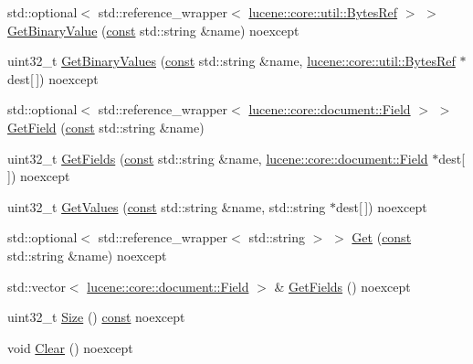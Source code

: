 \begin{DoxyCompactItemize}
\item 
std\+::optional$<$ std\+::reference\+\_\+wrapper$<$ \mbox{\hyperlink{classlucene_1_1core_1_1util_1_1BytesRef}{lucene\+::core\+::util\+::\+Bytes\+Ref}} $>$ $>$ \mbox{\hyperlink{classlucene_1_1core_1_1document_1_1Document_a3ec2c17e86ca5895821fb03f155c9d50}{Get\+Binary\+Value}} (\mbox{\hyperlink{ZlibCrc32_8h_a2c212835823e3c54a8ab6d95c652660e}{const}} std\+::string \&name) noexcept
\item 
uint32\+\_\+t \mbox{\hyperlink{classlucene_1_1core_1_1document_1_1Document_aa701ba52228c5faefba171031137a903}{Get\+Binary\+Values}} (\mbox{\hyperlink{ZlibCrc32_8h_a2c212835823e3c54a8ab6d95c652660e}{const}} std\+::string \&name, \mbox{\hyperlink{classlucene_1_1core_1_1util_1_1BytesRef}{lucene\+::core\+::util\+::\+Bytes\+Ref}} $\ast$dest\mbox{[}$\,$\mbox{]}) noexcept
\item 
std\+::optional$<$ std\+::reference\+\_\+wrapper$<$ \mbox{\hyperlink{classlucene_1_1core_1_1document_1_1Field}{lucene\+::core\+::document\+::\+Field}} $>$ $>$ \mbox{\hyperlink{classlucene_1_1core_1_1document_1_1Document_a30942eeb99fd914220503b9f68d9bd6a}{Get\+Field}} (\mbox{\hyperlink{ZlibCrc32_8h_a2c212835823e3c54a8ab6d95c652660e}{const}} std\+::string \&name)
\item 
uint32\+\_\+t \mbox{\hyperlink{classlucene_1_1core_1_1document_1_1Document_a8fcbb281ebfb1a4a075e189d099d3617}{Get\+Fields}} (\mbox{\hyperlink{ZlibCrc32_8h_a2c212835823e3c54a8ab6d95c652660e}{const}} std\+::string \&name, \mbox{\hyperlink{classlucene_1_1core_1_1document_1_1Field}{lucene\+::core\+::document\+::\+Field}} $\ast$dest\mbox{[}$\,$\mbox{]}) noexcept
\item 
uint32\+\_\+t \mbox{\hyperlink{classlucene_1_1core_1_1document_1_1Document_a03e64a0e27656bbb43009af1de585191}{Get\+Values}} (\mbox{\hyperlink{ZlibCrc32_8h_a2c212835823e3c54a8ab6d95c652660e}{const}} std\+::string \&name, std\+::string $\ast$dest\mbox{[}$\,$\mbox{]}) noexcept
\item 
std\+::optional$<$ std\+::reference\+\_\+wrapper$<$ std\+::string $>$ $>$ \mbox{\hyperlink{classlucene_1_1core_1_1document_1_1Document_aaa33b6b731feba963643568e9df77dfc}{Get}} (\mbox{\hyperlink{ZlibCrc32_8h_a2c212835823e3c54a8ab6d95c652660e}{const}} std\+::string \&name) noexcept
\item 
std\+::vector$<$ \mbox{\hyperlink{classlucene_1_1core_1_1document_1_1Field}{lucene\+::core\+::document\+::\+Field}} $>$ \& \mbox{\hyperlink{classlucene_1_1core_1_1document_1_1Document_a1300520e8ac371b602712cfd279284b4}{Get\+Fields}} () noexcept
\item 
uint32\+\_\+t \mbox{\hyperlink{classlucene_1_1core_1_1document_1_1Document_ad1556e7f0c71a2f347850d6d40392b0c}{Size}} () \mbox{\hyperlink{ZlibCrc32_8h_a2c212835823e3c54a8ab6d95c652660e}{const}} noexcept
\item 
void \mbox{\hyperlink{classlucene_1_1core_1_1document_1_1Document_a38df29c417f085cf8fe3741a4fef898f}{Clear}} () noexcept
\end{DoxyCompactItemize}
